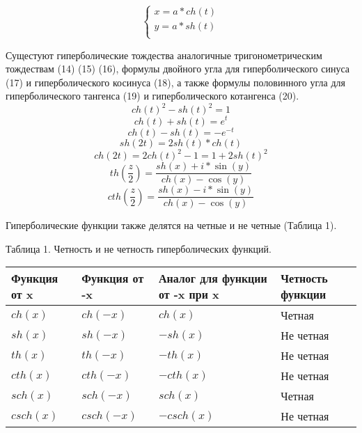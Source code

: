 \begin{equation}
    \begin{cases}
        x = a * ch(t)\\
        y = a * sh(t)\\
    \end{cases}
\end{equation}

Сущестуют гиперболические тождества аналогичные тригонометрическим тождествам (14) (15) (16), формулы двойного угла для гиперболического синуса (17) и гиперболического косинуса (18), а также формулы половинного угла для гиперболического тангенса (19) и гиперболического котангенса (20).
\begin{equation}
    ch(t)^2 - sh(t)^2 = 1
\end{equation}
\begin{equation}
    ch(t) + sh(t) = e^t
\end{equation}
\begin{equation}
    ch(t) - sh(t) = -e^{-t}
\end{equation}
\begin{equation}
    sh(2t) = 2sh(t)*ch(t)
\end{equation}
\begin{equation}
    ch(2t) = 2ch(t)^2 - 1 = 1 + 2sh(t)^2
\end{equation}
\begin{equation}
    th(\frac{z}{2})=\frac{sh(x)+i*\sin(y)}{ch(x)-\cos(y)}
\end{equation}
\begin{equation}
    cth(\frac{z}{2})=\frac{sh(x)-i*\sin(y)}{ch(x)-\cos(y)}
\end{equation}

Гиперболические функции также делятся на четные и не четные (Таблица 1).

Таблица 1. Четность и не четность гиперболических функций.
\begin{center}
\begin{tabular}{| p{3cm} | p{3cm} | p{3cm} | p{3cm} |}
    \hline
    Функция от x & Функция от -x & Аналог для функции от -x при x & Четность функции \\ \hline
    $ch(x)$ & $ch(-x)$ & $ch(x)$ & Четная  \\ \hline
    $sh(x)$ & $sh(-x)$ & $-sh(x)$ & Не четная \\\hline
    $th(x)$ & $th(-x)$ & $-th(x)$ &  Не четная  \\ \hline
    $cth(x)$ & $cth(-x)$ & $-cth(x)$ &  Не четная \\ \hline
    $sch(x)$ & $sch(-x)$ & $sch(x)$ & Четная \\ \hline
    $csch(x)$ & $csch(-x)$ & $-csch(x)$ &  Не четная \\ \hline
    \hline
\end{tabular}
\end{center}


